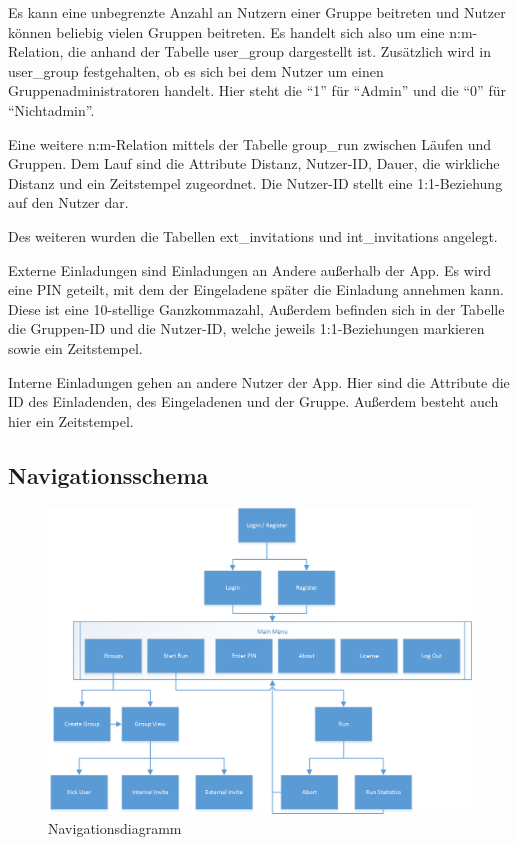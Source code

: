 Es kann eine unbegrenzte Anzahl an Nutzern einer Gruppe beitreten und Nutzer können beliebig vielen Gruppen beitreten. Es handelt sich also um eine n:m-Relation, die anhand der Tabelle user\_group dargestellt ist. Zusätzlich wird in user\_group festgehalten, ob es sich bei dem Nutzer um einen Gruppenadministratoren handelt. Hier steht die ``1'' für ``Admin'' und die ``0'' für ``Nichtadmin''.

Eine weitere n:m-Relation mittels der Tabelle group\_run zwischen Läufen und Gruppen. Dem Lauf sind die Attribute Distanz, Nutzer-ID, Dauer, die wirkliche Distanz und ein Zeitstempel zugeordnet. Die Nutzer-ID stellt eine 1:1-Beziehung auf den Nutzer dar.

Des weiteren wurden die Tabellen ext\_invitations und int\_invitations angelegt.

Externe Einladungen sind Einladungen an Andere außerhalb der App. Es wird eine PIN geteilt, mit dem der Eingeladene später die Einladung annehmen kann. Diese ist eine 10-stellige Ganzkommazahl, Außerdem befinden sich in der Tabelle die Gruppen-ID und die Nutzer-ID, welche jeweils 1:1-Beziehungen markieren sowie ein Zeitstempel.

Interne Einladungen gehen an andere Nutzer der App. Hier sind die Attribute die ID des Einladenden, des Eingeladenen und der Gruppe. Außerdem besteht auch hier ein Zeitstempel.
\subsection{Navigationsschema}
\begin{figure}[htb]
\centering
\includegraphics[width=\textwidth]{abb/navigation_diagram}
\caption{Navigationsdiagramm}
\end{figure}

